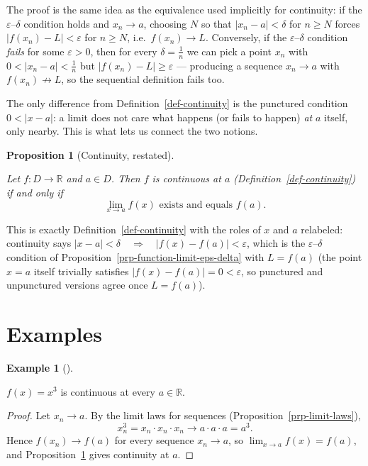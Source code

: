 \documentclass[
  letterpaper,
  DIV=11,
  numbers=noendperiod]{scrreprt}
\theoremstyle{plain}
\theoremstyle{plain}
\newtheorem{proposition}{Proposition}[chapter]
\theoremstyle{definition}
\theoremstyle{definition}
\theoremstyle{definition}
\newtheorem{example}{Example}[chapter]
\theoremstyle{plain}
\theoremstyle{plain}
\theoremstyle{remark}
\begin{document}
The proof is the same idea as the equivalence used implicitly for
continuity: if the \(\varepsilon\)--\(\delta\) condition holds and
\(x_n\to a\), choosing \(N\) so that \(\lvert x_n-a \rvert<\delta\) for
\(n\ge N\) forces \(\lvert f(x_n)-L \rvert<\varepsilon\) for \(n\ge N\),
i.e.~\(f(x_n)\to L\). Conversely, if the \(\varepsilon\)--\(\delta\)
condition \emph{fails} for some \(\varepsilon>0\), then for every
\(\delta = \tfrac1n\) we can pick a point \(x_n\) with
\(0<\lvert x_n-a \rvert<\tfrac1n\) but
\(\lvert f(x_n)-L \rvert\ge\varepsilon\) --- producing a sequence
\(x_n\to a\) with \(f(x_n)\not\to L\), so the sequential definition
fails too.

The only difference from Definition~\ref{def-continuity} is the
punctured condition \(0<\lvert x-a \rvert\): a limit does not care what
happens (or fails to happen) \emph{at} \(a\) itself, only nearby. This
is what lets us connect the two notions.

\begin{proposition}[Continuity,
restated]\protect\hypertarget{prp-continuity-via-limit}{}\label{prp-continuity-via-limit}

Let \(f\colon D\to\mathbb{R}\) and \(a\in D\). Then \(f\) is continuous
at \(a\) (Definition~\ref{def-continuity}) if and only if \[
\lim_{x\to a} f(x) \text{ exists and equals } f(a).
\]

\end{proposition}

This is exactly Definition~\ref{def-continuity} with the roles of \(x\)
and \(a\) relabeled: continuity says
\(\lvert x-a \rvert<\delta \quad \Rightarrow \quad\lvert f(x)-f(a) \rvert<\varepsilon\),
which is the \(\varepsilon\)--\(\delta\) condition of
Proposition~\ref{prp-function-limit-eps-delta} with \(L=f(a)\) (the
point \(x=a\) itself trivially satisfies
\(\lvert f(x)-f(a) \rvert=0<\varepsilon\), so punctured and unpunctured
versions agree once \(L=f(a)\)).

\section{Examples}\label{examples}

\begin{example}[]\protect\hypertarget{exm-cube-continuous}{}\label{exm-cube-continuous}

\hfill\break
\(f(x) = x^3\) is continuous at every \(a\in\mathbb{R}\).

\begin{proof}
Let \(x_n\to a\). By the limit laws for sequences
(Proposition~\ref{prp-limit-laws}), \[
x_n^3 = x_n\cdot x_n\cdot x_n \longrightarrow a\cdot a\cdot a = a^3.
\] Hence \(f(x_n)\to f(a)\) for every sequence \(x_n\to a\), so
\(\lim_{x\to a} f(x) = f(a)\), and
Proposition~\ref{prp-continuity-via-limit} gives continuity at \(a\).
\end{proof}

\end{example}
\end{document}
